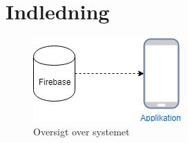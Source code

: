 \chapter{Indledning}


\begin{figure}[H]
	\centering
	\includegraphics[width=0.4\linewidth]{Indledning/Oversigtoversystem}
	\caption{Oversigt over systemet}
	\label{fig:OversigtSystembeskrivelse}
\end{figure}

